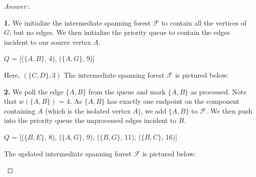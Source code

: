 \documentclass[11pt]{article}
\theoremstyle{definition}
\theoremstyle{definition}
\theoremstyle{definition}
\begin{document}
\begin{proof}[Answer:] \

\item \textbf{1.} We initialize the intermediate spanning forest $\mathcal{F}$ to contain all the vertices of $G$, but no edges. We then initialize the priority queue to contain the edges incident to our source vertex $A$.
\begin{center}
\item $Q$ = [($\{A, B\}$, 4), ($\{A, G\}$, 9)]
\item Here, $(\{C, D\}, 3)$ The intermediate spanning forest $\mathcal{F}$  is pictured below: \\

\end{center}

\item \textbf{2.} We poll the edge $\{A, B\}$ from the queue and mark $\{A, B\}$ as processed. Note that $w(\{A, B\})$ = 4. As $\{A, B\}$ has exactly one endpoint on the component containing $A$ (which is the isolated vertex $A$), we add $\{A, B\}$ to $\mathcal{F}$. We then push into the priority queue the unprocessed edges incident to $B$.
\begin{center}
\item $Q$ = [($\{B, E\}$, 8), ($\{A, G\}$, 9), ($\{B, G\}$, 11), ($\{B, C\}$, 16)]
\item The updated intermediate spanning forest $\mathcal{F}$ is pictured below: \\

\end{center}
\end{proof}
\end{document}
